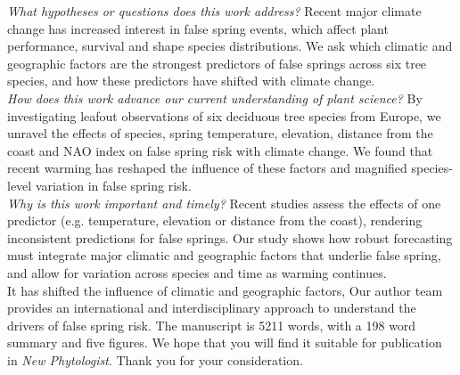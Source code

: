 \documentclass[11pt,a4paper]{article}\usepackage[]{graphicx}\usepackage[]{color}
\begin{document}
\noindent \textit{What hypotheses or questions does this work address?} Recent major climate change has increased interest in false spring events, which affect plant performance, survival and shape species distributions. We ask which climatic and geographic factors are the strongest predictors of false springs across six tree species, and how these predictors have shifted with climate change. \\

\noindent \textit{How does this work advance our current understanding of plant science?} By investigating leafout observations of six deciduous tree species from Europe, we unravel the effects of species, spring temperature, elevation, distance from the coast and NAO index on false spring risk with climate change. We found that recent warming has reshaped the influence of these factors and magnified species-level variation in false spring risk.\\

\noindent \textit{Why is this work important and timely?} Recent studies assess the effects of one predictor (e.g. temperature, elevation or distance from the coast), rendering inconsistent predictions for false springs. Our study shows how robust forecasting must integrate major climatic and geographic factors that underlie false spring, and allow for variation across species and time as warming continues. \\

It has shifted the influence of climatic and geographic factors,
\noindent Our author team provides an international and interdisciplinary approach to understand the drivers of false spring risk. The manuscript is 5211 words, with a 198 word summary and five figures. We hope that you will find it suitable for publication in \textit{New Phytologist}. Thank you for your consideration. \\
\end{document}
